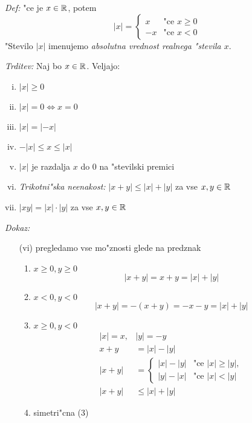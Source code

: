 \emph{Def:} "ce je $x \in \mathbb{R}$, potem
\begin{equation*}
|x| = \begin{cases}
x & \text{"ce $x \geq 0$}\\
-x & \text{"ce $x < 0$}
\end{cases}
\end{equation*}
"Stevilo $|x|$ imenujemo \emph{absolutna vrednost realnega "stevila $x$}.

\emph{Trditev:} Naj bo $x \in \mathbb{R}$. Veljajo:
\begin{enumerate}[(i)]
	\item $|x| \geq 0$
	\item $|x| = 0 \Leftrightarrow x = 0$
	\item $|x| = |-x|$
	\item $-|x| \leq x \leq |x|$
	\item $|x|$ je razdalja $x$ do 0 na "stevilski premici
	\item \emph{Trikotni"ska neenakost:} $|x + y| \leq |x| + |y|$ za vse $x, y \in \mathbb{R}$
	\item $|xy| = |x| \cdot |y|$ za vse $x, y \in \mathbb{R}$
\end{enumerate}

\emph{Dokaz:}
\begin{itemize}
	\item[(vi)] pregledamo vse mo"znosti glede na predznak
	\begin{enumerate}[(1)]
		\item $x \geq 0, y \geq 0$
		\begin{equation*}
			|x + y| = x + y = |x| + |y|
		\end{equation*}
		
		\item $x < 0, y < 0$
		\begin{equation*}
			|x + y| = -(x + y) = -x - y = |x| + |y|
		\end{equation*}
		
		\item $x \geq 0, y < 0$
		\begin{align*}
			|x| = x,& |y| = -y\\
			x + y &= |x| - |y|\\
			|x + y| &= \begin{cases}
				|x| - |y| & \text{"ce }|x| \geq |y|,\\
				|y| - |x| & \text{"ce }|x| < |y|
			\end{cases}\\
			|x + y| &\leq |x| + |y|
		\end{align*}
		
		\item simetri"cna (3)
	\end{enumerate}
\end{itemize}


